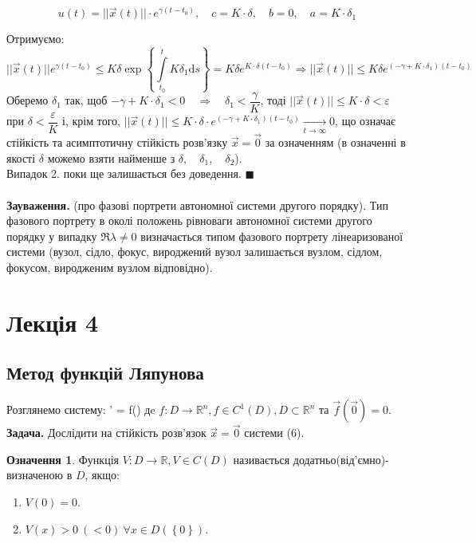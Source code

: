 \documentclass[14pt,a4paper]{scrartcl}
\theoremstyle{definition}
\newtheorem*{defo}{Означення}
\theoremstyle{definition}
\theoremstyle{definition}
\begin{document}
$$ u(t) = ||\overrightarrow{x}(t)|| \cdot e^{\gamma(t - t_0)}, \quad c = K \cdot \delta, \quad b = 0, \quad a = K \cdot \delta_1$$

Отримуємо: $$||\overrightarrow{x}(t)|| e^{\gamma(t - t_0)} \!\leq\! K \delta \exp \left\lbrace {\int\limits_{t_0}^{t} K \delta_1 \mathrm{d}s} \right\rbrace \!=\! K \delta e^{K \cdot \delta (t - t_0)} \!\Rightarrow\! ||\overrightarrow{x}(t)|| \!\leq\! K \delta e^{(-\gamma + K \cdot \delta_1)(t - t_0)}$$ Оберемо $\delta_1$ так, щоб $-\gamma + K \cdot \delta_1 < 0 \quad \Longrightarrow \quad \delta_1 < \dfrac{\gamma}{K}$, тоді $||\overrightarrow{x}(t)|| \leq K \cdot \delta < \varepsilon$ при $\delta < \dfrac{\varepsilon}{K}$ і, крім того, $||\overrightarrow{x}(t)|| \leq K \cdot \delta \cdot e^{(-\gamma + K \cdot \delta_1)(t - t_0)} \xrightarrow[t \to \infty]{} 0$, що означає стійкість та асимптотичну стійкість розв'язку $\overrightarrow{x} = \overrightarrow{0}$ за означенням (в означенні в якості $\delta$ можемо взяти найменше з $\delta, \quad \delta_1, \quad \delta_2$).\\ Випадок 2. поки ще залишається без доведення. $\blacksquare$ \\ \\
\textbf{Зауваження.} (про фазові портрети автономної системи другого порядку). Тип фазового портрету в околі положень рівноваги автономної системи другого порядку у випадку $\Re \lambda \neq 0$ визначається типом фазового портрету лінеаризованої системи (вузол, сідло, фокус, вироджений вузол залишається вузлом, сідлом, фокусом, виродженим вузлом відповідно). \\

\section{Лекція 4}
\subsection{Метод функцій Ляпунова}
Розглянемо систему:
\be
 ' = f()
\ee
дe $f: D \to \mathbb{R}^n, f\in C^{1} \left( D \right), D \subset \mathbb{R}^n $ та $\overrightarrow{f} ( \overrightarrow{0}) = 0$. \textbf{Задача. } Дослідити на стійкість розв'язок $ \overrightarrow{x} = \overrightarrow{0}$ системи (6).
 \begin{defo}
  Функція $V : D \to \mathbb{R}, V \in C(D) $ називається додатньо(від'ємно)-визначеною в $D$, якщо:
\begin{enumerate}
  \item $V(0) = 0$.
  \item $V(x) > 0 \ (<0) \ \forall x \in D(\left\lbrace 0 \right\rbrace)$.
\end{enumerate}
 \end{defo}
\end{document}
